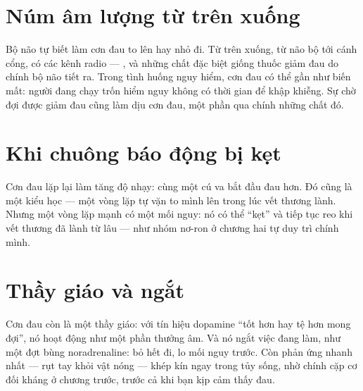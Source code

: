 \section*{Núm âm lượng từ trên xuống}

Bộ não tự biết làm cơn đau to lên hay nhỏ đi. Từ trên xuống, từ não bộ tới cánh cổng, có các kênh radio --- ,  và những chất đặc biệt giống thuốc giảm đau do chính bộ não tiết ra. Trong tình huống nguy hiểm, cơn đau có thể gần như biến mất: người đang chạy trốn hiểm nguy không có thời gian để khập khiễng. Sự chờ đợi được giảm đau cũng làm dịu cơn đau, một phần qua chính những chất đó.

\section*{Khi chuông báo động bị kẹt}

Cơn đau lặp lại làm tăng độ nhạy: cùng một cú va bắt đầu đau hơn. Đó cũng là một kiểu học --- một vòng lặp tự vặn to mình lên trong lúc vết thương lành. Nhưng một vòng lặp mạnh có một mối nguy: nó có thể ``kẹt'' và tiếp tục reo khi vết thương đã lành từ lâu --- như nhóm nơ-ron ở chương hai tự duy trì chính mình.

\section*{Thầy giáo và ngắt}

Cơn đau còn là một thầy giáo: với tín hiệu dopamine ``tốt hơn hay tệ hơn mong đợi'', nó hoạt động như một phần thưởng âm. Và nó ngắt việc đang làm, như một đợt bùng noradrenaline: bỏ hết đi, lo mối nguy trước. Còn phản ứng nhanh nhất --- rụt tay khỏi vật nóng --- khép kín ngay trong tủy sống, nhờ chính cặp cơ đối kháng ở chương trước, trước cả khi bạn kịp cảm thấy đau.

